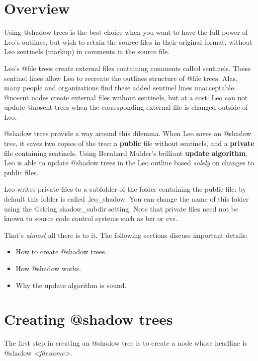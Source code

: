 \documentclass[a4paper,10pt,english]{sphinxmanual}
\begin{document}
\section{Overview}
\label{atShadow:auto-trees}\label{atShadow:overview}
Using @shadow trees is the best choice when you want to have the full power of
Leo's outlines, but wish to retain the source files in their original format,
without Leo sentinels (markup) in comments in the source file.

Leo's @file trees create external files containing comments called sentinels.
These sentinel lines allow Leo to recreate the outlines structure of @file
trees. Alas, many people and organizations find these added sentinel lines
unacceptable. @nosent nodes create external files without sentinels, but at a
cost: Leo can not update @nosent trees when the corresponding external file is
changed outside of Leo.

@shadow trees provide a way around this dilemma. When Leo saves an @shadow
tree, it saves two copies of the tree: a \textbf{public} file without sentinels, and
a \textbf{private} file containing sentinels. Using Bernhard Mulder's brilliant
\textbf{update algorithm}, Leo is able to update @shadow trees in the Leo outline
based \emph{solely} on changes to public files.

Leo writes private files to a subfolder of the folder containing the public file:
by default this folder is called .leo\_shadow.
You can change the name of this folder using the @string shadow\_subdir setting.
Note that private files need not be known to source code control systems such as bzr or cvs.

That's \emph{almost} all there is to it.  The following sections discuss important details:
\begin{itemize}
\item {} 
How to create @shadow trees.

\item {} 
How @shadow works.

\item {} 
Why the update algorithm is sound.

\end{itemize}


\section{Creating @shadow trees}
\label{atShadow:creating-shadow-trees}
The first step in creating an @shadow tree is to create a node whose headline is @shadow \emph{\textless{}filename\textgreater{}}.
\end{document}
